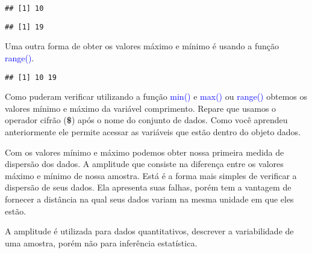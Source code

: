 \documentclass[titlepage, oneside, openany, a4paper]{book}
\newenvironment{Shaded}{\begin{snugshade}}{\end{snugshade}}
\newcommand{\KeywordTok}[1]{\textcolor[rgb]{0.13,0.29,0.53}{\textbf{#1}}}
\newcommand{\NormalTok}[1]{#1}
\newcommand{\OperatorTok}[1]{\textcolor[rgb]{0.81,0.36,0.00}{\textbf{#1}}}
\newcommand{\StringTok}[1]{\textcolor[rgb]{0.31,0.60,0.02}{#1}}
\begin{document}
\begin{verbatim}
## [1] 10
\end{verbatim}

\begin{Shaded}
\end{Shaded}

\begin{verbatim}
## [1] 19
\end{verbatim}

Uma outra forma de obter os valores máximo e mínimo é usando a função \textcolor{blue}{range()}.

\begin{Shaded}
\end{Shaded}

\begin{verbatim}
## [1] 10 19
\end{verbatim}

Como puderam verificar utilizando a função \textcolor{blue}{min()} e \textcolor{blue}{max()} ou \textcolor{blue}{range()} obtemos os valores mínimo e máximo da variável comprimento. Repare que usamos o operador cifrão (\textbf{\$}) após o nome do conjunto de dados. Como você aprendeu anteriormente ele permite acessar as variáveis que estão dentro do objeto dados.

Com os valores mínimo e máximo podemos obter nossa primeira medida de dispersão dos dados. A amplitude que consiste na diferença entre os valores máximo e mínimo de nossa amostra. Está é a forma mais simples de verificar a dispersão de seus dados. Ela apresenta suas falhas, porém tem a vantagem de fornecer a distância na qual seus dados variam na mesma unidade em que eles estão.

A amplitude é utilizada para dados quantitativos, descrever a variabilidade de uma amostra, porém não para inferência estatística.

\begin{Shaded}
\end{Shaded}
\end{document}
